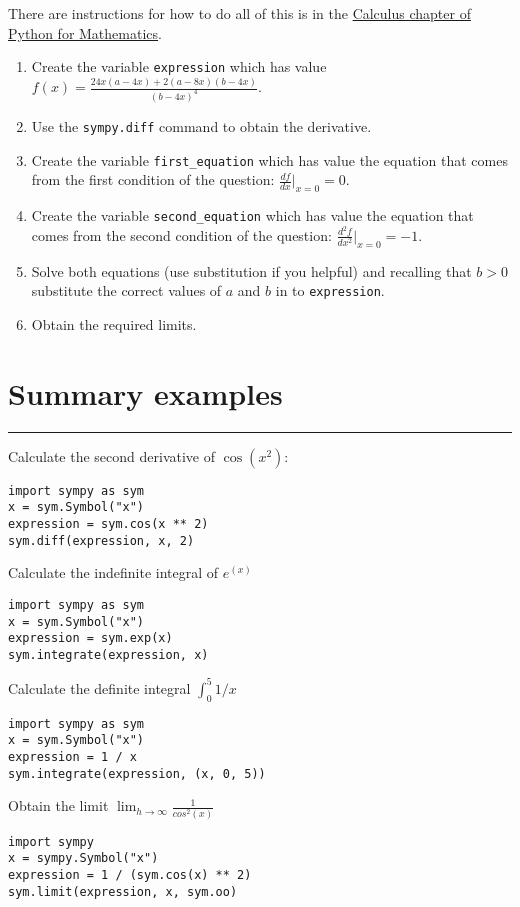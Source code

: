 \documentclass{article}
\begin{document}
There are instructions for how to do all of this is in the
\href{https://vknight.org/pfm/tools-for-mathematics/03-calculus/how/main.html}{Calculus chapter of Python for Mathematics}.


\begin{enumerate}
\item
  Create the variable \texttt{expression} which has value
        $f(x)= \frac{24 x \left(a - 4 x\right) + 2 \left(a - 8 x\right) \left(b - 4 x\right)}{\left(b - 4 x\right)^{4}}$.
\item Use the \texttt{sympy.diff} command to obtain the
        derivative.
\item Create the variable \texttt{first_equation} which has value the
    equation that comes from the first condition of the question:
        $\frac{df}{dx}|_{x=0} = 0$.
\item Create the variable \texttt{second_equation} which has value the
    equation that comes from the second condition of the question:
        $\frac{d^2f}{dx^2}|_{x=0} = -1$.
    \item Solve both equations (use substitution if you helpful) and recalling
        that $b>0$ substitute the correct values of $a$ and $b$ in to
        \texttt{expression}.
    \item Obtain the required limits.
\end{enumerate}

\section{Summary examples}
\hrule

\begin{multicols}{2}
    Calculate the second derivative of $\cos(x^2)$:

        \begin{verbatim}
import sympy as sym
x = sym.Symbol("x")
expression = sym.cos(x ** 2)
sym.diff(expression, x, 2)
    \end{verbatim}

        Calculate the indefinite integral of $e^(x)$

        \begin{verbatim}
import sympy as sym
x = sym.Symbol("x")
expression = sym.exp(x)
sym.integrate(expression, x)
        \end{verbatim}

        Calculate the definite integral $\int_0^{5}1/x$

        \begin{verbatim}
import sympy as sym
x = sym.Symbol("x")
expression = 1 / x
sym.integrate(expression, (x, 0, 5))
        \end{verbatim}

        Obtain the limit $\lim_{h \to \infty}\frac{1}{cos^2(x)}$

        \begin{verbatim}
import sympy
x = sympy.Symbol("x")
expression = 1 / (sym.cos(x) ** 2)
sym.limit(expression, x, sym.oo)
        \end{verbatim}
\end{multicols}
\end{document}
